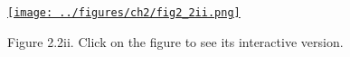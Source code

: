 \documentclass{article}
\begin{document}
\begin{figure}[h]
    \begin{center}
        \href{http://www.gatsby.ucl.ac.uk/~rapela/durbinAndKoopman12/figures/ch2/fig2_2ii.html}{\texttt{[image: ../figures/ch2/fig2\_2ii.png]}}
    \end{center}
    \caption{Figure 2.2ii. Click on the figure to see its interactive version.}
\end{figure}


\end{document}
